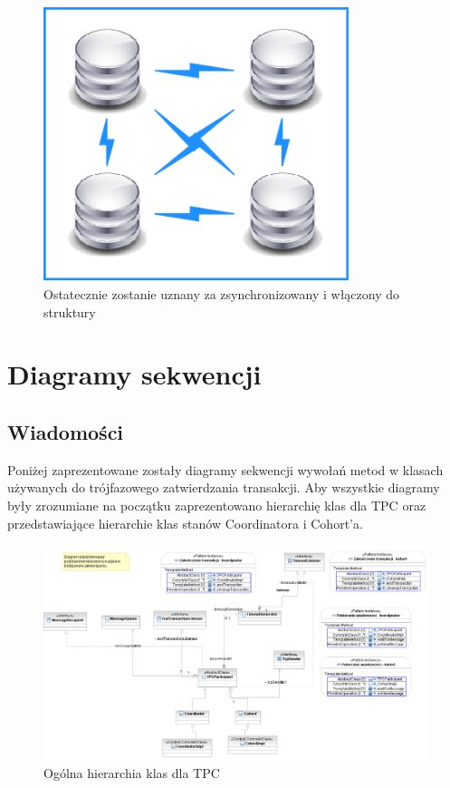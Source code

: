 \documentclass[a4paper, oneside, 11pt]{report}
\begin{document}
\begin{figure}[h]
\centering
\includegraphics[height=8cm]{restore_connected.png}
\caption{Ostatecznie zostanie uznany za zsynchronizowany i włączony do struktury}
\end{figure}

\chapter{Diagramy sekwencji}
\section{Wiadomości}
Poniżej zaprezentowane zostały diagramy sekwencji wywołań metod w klasach używanych do trójfazowego zatwierdzania transakcji. Aby wszystkie diagramy były zrozumiane na początku zaprezentowano hierarchię klas dla TPC oraz przedstawiające hierarchie klas stanów Coordinatora i Cohort'a.
\begin{figure}[h]
\centering
\includegraphics[width=22cm,angle=90]{sekwencje/TPC.png}
\caption{Ogólna hierarchia klas dla TPC}
\end{figure}
\end{document}
